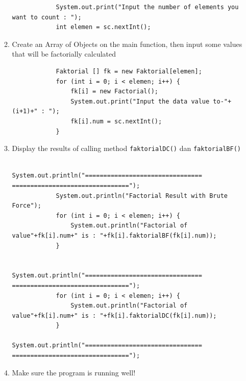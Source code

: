 \documentclass[12pt,titlepage]{article}
\begin{document}
\begin{enumerate}
\begin{enumerate}
\begin{verbatim}
            System.out.print("Input the number of elements you want to count : ");
            int elemen = sc.nextInt();
        \end{verbatim}
        \item Create an Array of Objects on the main function, then input some values that will be factorially calculated
        \begin{verbatim}
            Faktorial [] fk = new Faktorial[elemen];
            for (int i = 0; i < elemen; i++) {
                fk[i] = new Factorial();
                System.out.print("Input the data value to-"+(i+1)+" : ");
                fk[i].num = sc.nextInt();
            }
        \end{verbatim}
        \item Display the results of calling method \texttt{faktorialDC()} dan \texttt{faktorialBF()}
        \begin{verbatim}
            System.out.println("================================ ================================");
            System.out.println("Factorial Result with Brute Force");
            for (int i = 0; i < elemen; i++) {
                System.out.println("Factorial of value"+fk[i].num+" is : "+fk[i].faktorialBF(fk[i].num));
            }
            
            System.out.println("================================ ================================");
            for (int i = 0; i < elemen; i++) {
                System.out.println("Factorial of value"+fk[i].num+" is : "+fk[i].faktorialDC(fk[i].num));
            }
            System.out.println("================================ ================================");
        \end{verbatim}
        \item Make sure the program is running well!
    \end{enumerate}
\end{enumerate}
\end{document}
